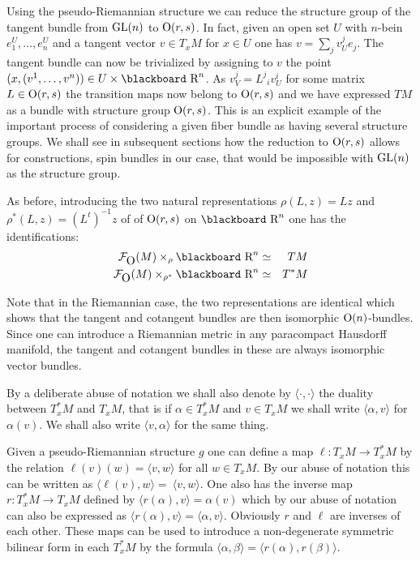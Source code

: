 \documentclass[12pt,titlepage]{article}
\def\bbf#1{\hbox{\blackboard #1}}
\def\lR{\bbf R}
\def\cF{{\cal F}}
\def\GL{\hbox{GL}}
\def\O{\hbox{O}}
\begin{document}
Using the pseudo-Riemannian structure we can reduce the structure group
of the tangent bundle from \(\GL(n)\) to \(\O(r,s)\). In fact, given an
open set \(U\) with \(n\)-bein \(e^U_1,\dots,e^U_n\) and a tangent
vector \(v\in T_xM\) for \(x\in U\) one has \(v = \sum_jv^j_Ue_j\). The
tangent bundle can now be trivialized by assigning to \(v\) the point
\((x, (v^1,\dots,v^n))\in U\times\lR^n\). As  \(v^j_V = L^j{}_iv^i_U\)
for some matrix \(L\in \O(r,s)\) the transition maps now belong to
\(\O(r,s)\) and we have expressed \(TM\) as a bundle with structure group
\(\O(r,s)\). This is an explicit example of the important process of
considering a given fiber bundle as having several structure groups.
We shall see  in subsequent sections how the reduction to \(\O(r,s)\)
allows for constructions, spin bundles in our case,
 that would be impossible with \(\GL(n)\) as the
structure group.

As before, introducing the two natural representations
\(\rho(L,z) = Lz\) and \(\rho^*(L,z) = (L^t)^{-1}z\)  of
of \(\O(r,s)\) on \(\lR^n\)
one  has the identifications:
\begin{eqnarray}\label{eq:fotm}
\cF_{\O}(M)\times_\rho {\lR}^n  &\simeq &  TM \\ \label{eq:focotm}
\cF_{\O}(M)\times_{\rho^*} {\lR}^n &\simeq &  T^*M
\end{eqnarray}%

Note that in the Riemannian case, the two
representations are identical which shows that the tangent and cotangent
bundles are then isomorphic \(\O(n)\)-bundles. Since one can introduce a 
Riemannian metric in any paracompact Hausdorff manifold, 
the tangent and cotangent bundles in these are always isomorphic 
vector bundles.

By a deliberate abuse of notation we shall also denote by
\(\langle\cdot,\cdot\rangle\) the duality between \(T^*_xM \) and \(T_xM\), that is
if \(\alpha\in T^*_xM\) and \(v\in T_xM\) we shall write \(\langle\alpha,v\rangle\)
for \(\alpha(v)\). We shall also write \(\langle v,\alpha\rangle\) for the same
thing.

Given a pseudo-Riemannian structure \(g\) one can define a map
\(\ell:T_xM \to T^*_xM\)
% 
by the relation \(\ell(v)(w) =  \langle v,w \rangle\) for all
\(w\in T_xM\). By our abuse of notation this can be written as
\(\langle\ell(v), w\rangle = \ \langle v,w \rangle\). One also has the inverse map \(r:T^*_xM \to
T_xM\)
% 
defined by \(\langle r(\alpha),v\rangle = \alpha(v)\) 
which by our abuse of
notation can also be expressed as \(\langle r(\alpha),v \rangle = \langle \alpha,v \rangle\).
Obviously \(r\) and \(\ell\) are inverses of each other. These maps can
be used to introduce a non-degenerate symmetric bilinear form in
each \(T^*_xM\) by the formula \(\langle\alpha,\beta \rangle = \langle r(\alpha),r(\beta) \rangle\).
\end{document}
